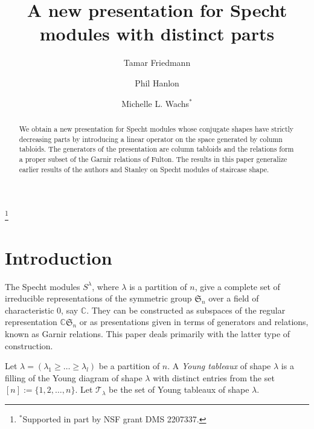 \documentclass[12pt]{amsart}
\numberwithin{equation}{section}
\def\sg{\mathfrak S}
\begin{document}
\title{A new presentation for Specht modules with distinct parts}
\author[Friedmann]{Tamar Friedmann}
\address{Department of Mathematics, Colby College}

\author[Hanlon]{Phil Hanlon}
\address{Department of Mathematics, Dartmouth College}

\author[Wachs]{Michelle L. Wachs$^*$}
\address{Department of Mathematics, University of Miami}
\thanks{$^{*}$Supported in part by NSF grant
 DMS 2207337.}




\begin{abstract}  
We obtain a new presentation for Specht modules whose conjugate shapes have strictly decreasing parts by introducing a linear operator on the space generated by column tabloids. The generators of the presentation are column tabloids and the relations form a proper subset of the Garnir relations of Fulton.  The results in this paper  generalize  earlier results of the authors and Stanley on Specht modules of staircase shape. 
\end{abstract} 


\maketitle

\section{Introduction} \label{intro}

The Specht modules $S^\lambda$, where $\lambda$ is a partition of $n$, give a complete set of  irreducible 
representations of the symmetric group $\sg_n$ over a field  of characteristic $0$, say $\mathbb C $.  They can be constructed as  
subspaces of the regular representation $\mathbb C \sg_n$  or  as presentations given in terms of generators and relations, 
known as Garnir relations.   This paper deals primarily with the latter type of construction. 




Let $\lambda= (\lambda_1 \geq\dots \geq \lambda_l)$ be a partition of $n$.  A {\em Young tableaux} of shape $\lambda$ is a filling of the Young diagram of shape $\lambda$ with distinct entries from the set $[n]:=\{1,2,\dots,n\}$.  Let $\mathcal T_\lambda$ be the set of  Young tableaux of shape
$\lambda$. 
\end{document}
